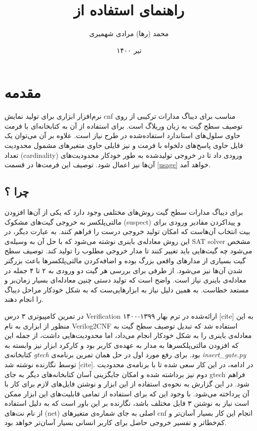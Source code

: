 \documentclass{article}
\title{راهنمای استفاده از \lr{uv2cnf}\\
\lr{(Upgraded CNF to Verilog)}}
\date{تیر ۱۴۰۰}
\author{محمد (رها) مرادی شهمیری\\\lr{raham9619@gmail.com}}
\begin{document}
\maketitle
\newpage
\rl{\tableofcontents}
\newpage


\section{مقدمه}
نرم‌افزار  ابزاری برای تولید نمایش cnf مناسب برای دیباگ مدارات ترکیبی از روی توصیف سطح گیت به زبان وریلاگ است. 
برای استفاده از آن به کتابخانه‌ای با فرمت  حاوی سلول‌های استاندارد استفاده‌شده در طرح نیاز است. علاوه بر آن می‌توان 
یک فایل حاوی پاسخ‌های دلخواه با فرمت  و نیز فایلی حاوی متغیرهای مشمول محدودیت تعداد (cardinality) ورودی داد تا در خروجی 
تولیدشده به طور خودکار محدودیت‌های آن‌ها نیز اعمال شود. توصیف این فرمت‌ها در قسمت \ref{usage} خواهد آمد. 

\subsection{چرا ؟}

برای دیباگ مدارات سطح گیت روش‌های مختلفی وجود دارد که یکی از آن‌ها افزودن مالتی‌پلکسر به خروجی گیت‌های مشکوک (suspect) و پیداکردن مقادیر ورودی برای بیت انتخاب آن‌هاست که امکان تولید خروجی درست را فراهم کنند. به عبارت دیگر، در این روش معادله‌ی باینری نوشته می‌شود که با حل آن به وسیله‌ی SAT solver مشخص می‌شود چه گیت‌هایی باید تغییر کنند تا مدار خروجی مطلوب را تولید کند. توصیف سطح گیت بسیاری از مدارهای واقعی بزرگ بوده و اضافه‌کردن مالتی‌پلکسرها باعث بزرگتر شدن آن‌ها نیز می‌شود. از طرفی برای بررسی هر گیت دو ورودی به ۲ تا ۴ جمله در معادله‌ی باینری نیاز است. واضح است که تولید دستی چنین معادله‌ای بسیار زمان‌بر و مستعد خطاست. به همین دلیل نیاز به ابزارهایی‌ست که به شکل خودکار مراحل دیباگ را انجام دهند. 

در تمرین کامپیوتری ۳ درس Verification ارائه‌شده در ترم بهار ۱۳۹۹-۱۴۰۰ [cite] به این منظور از ابزاری به نام Verilog2CNF استفاده شد که تبدیل توصیف سطح گیت به معادله‌ی باینری را به شکل خودکار انجام می‌داد، اما محدودیت‌هایی داشت، از جمله این که افزودن مالتی‌پلکسرها به مدار به عهده‌ی کاربر بود و کارکرد ابزار نیز وابسته به کتابخانه‌ی \textit{gtech} بود. برای رفع مورد اول در حل همان تمرین برنامه‌ی \textit{insert\_gate.py} توسط نگارنده نوشته شد [cite]. در ادامه، در این کار سعی شده تا با برنامه‌ی  محدودیت دوم نیز برداشته شده و امکان جایگزینی آسان کتابخانه‌های دیگر به جای gtech فراهم شود. در این گزارش به نحوه‌ی استفاده از این ابزار و نوشتن فایل‌های لازم برای کار با آن پرداخته می‌شود. با وجود این که برای استفاده از تمامی قابلیت‌های این ابزار ممکن است نیاز به نوشتن ۳ فایل مختلف باشد، نگارنده بر این باور است که به دلیل استفاده از نام نت‌های (net) اصلی به جای شماره‌ی متغیرهای cnf انجام این کار بسیار آسان‌تر و کم‌خطاتر و تفسیر خروجی حاصل برای کاربر انسانی بسیار آسان‌تر خواهد بود. 
\end{document}
